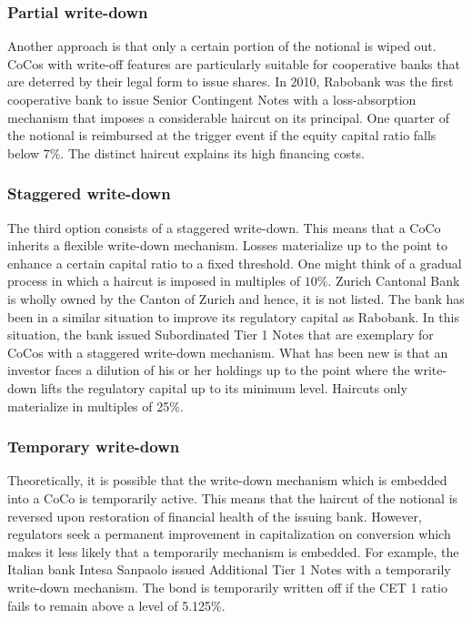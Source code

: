 \subsubsection*{Partial write-down}
Another approach is that only a certain portion of the notional is wiped out. CoCos with write-off features are particularly suitable for cooperative banks that are deterred by their legal form to issue shares. \citep{de2014handbook} In 2010, Rabobank was the first cooperative bank to issue Senior Contingent Notes with a loss-absorption mechanism that imposes a considerable haircut on its principal. One quarter of the notional is reimbursed at the trigger event if the equity capital ratio falls below 7\%. The distinct haircut explains its high financing costs. 
\citep{rabobank2010}

\subsubsection*{Staggered write-down}
The third option consists of a staggered write-down. This means that a CoCo inherits a flexible write-down mechanism. Losses materialize up to the point to enhance a certain capital ratio to a fixed threshold. One might think of a gradual process in which a haircut is imposed in multiples of $10\%$. \citep{de2014handbook} Zurich Cantonal Bank is wholly owned by the Canton of Zurich and hence, it is not listed. The bank has been in a similar situation to improve its regulatory capital as Rabobank. In this situation, the bank issued Subordinated Tier 1 Notes that are exemplary for CoCos with a staggered write-down mechanism. What has been new is that an investor faces a dilution of his or her holdings up to the point where the write-down lifts the regulatory capital up to its minimum level. Haircuts only materialize in multiples of 25\%. \citep{zkv2013}

\subsubsection*{Temporary write-down}
Theoretically, it is possible that the write-down mechanism which is embedded into a CoCo is temporarily active. This means that the haircut of the notional is reversed upon restoration of financial health of the issuing bank. However, regulators seek a permanent improvement in capitalization on conversion which makes it less likely that a temporarily mechanism is embedded. \citep{avdjiev2013cocos} For example, the Italian bank Intesa Sanpaolo issued Additional Tier 1 Notes with a temporarily write-down mechanism. The bond is temporarily written off if the CET 1 ratio fails to remain above a level of 5.125\%. \citep{intesa2016temporary}


